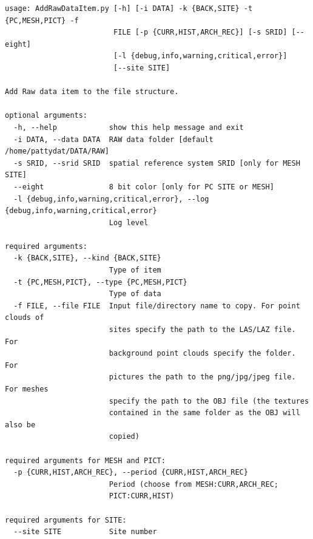 \begin{Verbatim}[fontfamily=courier,commandchars=\\\{\},fontsize=\footnotesize]
usage: AddRawDataItem.py [-h] [-i DATA] -k {BACK,SITE} -t {PC,MESH,PICT} -f
                         FILE [-p {CURR,HIST,ARCH_REC}] [-s SRID] [--eight]
                         [-l {debug,info,warning,critical,error}]
                         [--site SITE]

Add Raw data item to the file structure.

optional arguments:
  -h, --help            show this help message and exit
  -i DATA, --data DATA  RAW data folder [default /home/pattydat/DATA/RAW]
  -s SRID, --srid SRID  spatial reference system SRID [only for MESH SITE]
  --eight               8 bit color [only for PC SITE or MESH]
  -l {debug,info,warning,critical,error}, --log {debug,info,warning,critical,error}
                        Log level

required arguments:
  -k {BACK,SITE}, --kind {BACK,SITE}
                        Type of item
  -t {PC,MESH,PICT}, --type {PC,MESH,PICT}
                        Type of data
  -f FILE, --file FILE  Input file/directory name to copy. For point clouds of
                        sites specify the path to the LAS/LAZ file. For
                        background point clouds specify the folder. For
                        pictures the path to the png/jpg/jpeg file. For meshes
                        specify the path to the OBJ file (the textures
                        contained in the same folder as the OBJ will also be
                        copied)

required arguments for MESH and PICT:
  -p {CURR,HIST,ARCH_REC}, --period {CURR,HIST,ARCH_REC}
                        Period (choose from MESH:CURR,ARCH_REC;
                        PICT:CURR,HIST)

required arguments for SITE:
  --site SITE           Site number
\end{Verbatim}

